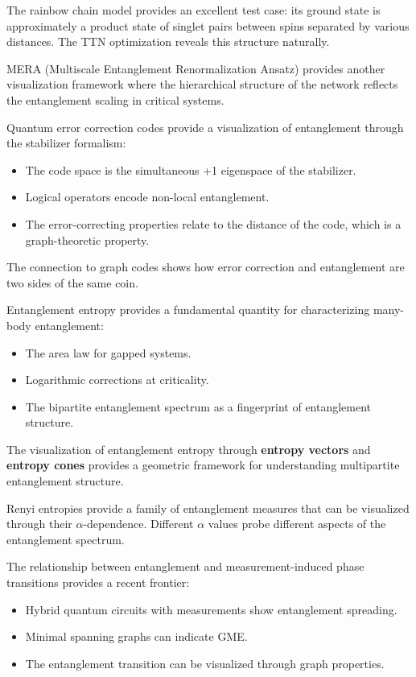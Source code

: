 \documentclass[12pt,a4paper]{article}
\begin{document}
The rainbow chain model provides an excellent test case: its ground state is approximately a product state of singlet pairs between spins separated by various distances. The TTN optimization reveals this structure naturally.

MERA (Multiscale Entanglement Renormalization Ansatz) provides another visualization framework where the hierarchical structure of the network reflects the entanglement scaling in critical systems.

Quantum error correction codes provide a visualization of entanglement through the stabilizer formalism:
\begin{itemize}
	\item The code space is the simultaneous +1 eigenspace of the stabilizer.
	\item Logical operators encode non-local entanglement.
	\item The error-correcting properties relate to the distance of the code, which is a graph-theoretic property.
\end{itemize}

The connection to graph codes shows how error correction and entanglement are two sides of the same coin.

Entanglement entropy provides a fundamental quantity for characterizing many-body entanglement:
\begin{itemize}
	\item The area law for gapped systems.
	\item Logarithmic corrections at criticality.
	\item The bipartite entanglement spectrum as a fingerprint of entanglement structure.
\end{itemize}

The visualization of entanglement entropy through \textbf{entropy vectors} and \textbf{entropy cones} provides a geometric framework for understanding multipartite entanglement structure.

Renyi entropies provide a family of entanglement measures that can be visualized through their $\alpha$-dependence. Different $\alpha$ values probe different aspects of the entanglement spectrum.

The relationship between entanglement and measurement-induced phase transitions provides a recent frontier:
\begin{itemize}
	\item Hybrid quantum circuits with measurements show entanglement spreading.
	\item Minimal spanning graphs can indicate GME.
	\item The entanglement transition can be visualized through graph properties.
\end{itemize}
\end{document}
